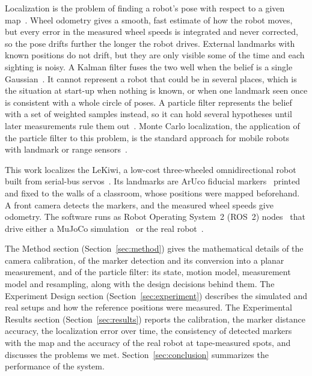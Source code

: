 \documentclass[conference]{IEEEtran}
\begin{document}
Localization is the problem of finding a robot's pose with respect to a given map~\cite{clark6b}. Wheel odometry gives a smooth, fast estimate of how the robot moves, but every error in the measured wheel speeds is integrated and never corrected, so the pose drifts further the longer the robot drives. External landmarks with known positions do not drift, but they are only visible some of the time and each sighting is noisy. A Kalman filter fuses the two well when the belief is a single Gaussian~\cite{clark6b}. It cannot represent a robot that could be in several places, which is the situation at start-up when nothing is known, or when one landmark seen once is consistent with a whole circle of poses. A particle filter represents the belief with a set of weighted samples instead, so it can hold several hypotheses until later measurements rule them out~\cite{gordon1993,dellaert1999,thrun2005,clark7b}. Monte Carlo localization, the application of the particle filter to this problem, is the standard approach for mobile robots with landmark or range sensors~\cite{dellaert1999,thrun2005}.

This work localizes the LeKiwi, a low-cost three-wheeled omnidirectional robot built from serial-bus servos~\cite{lerobot}. Its landmarks are ArUco fiducial markers~\cite{garrido2014} printed and fixed to the walls of a classroom, whose positions were mapped beforehand. A front camera detects the markers, and the measured wheel speeds give odometry. The software runs as Robot Operating System~2 (ROS~2) nodes~\cite{macenski2022} that drive either a MuJoCo simulation~\cite{todorov2012} or the real robot~\cite{for26}.

The Method section (Section~\ref{sec:method}) gives the mathematical details of the camera calibration, of the marker detection and its conversion into a planar measurement, and of the particle filter: its state, motion model, measurement model and resampling, along with the design decisions behind them. The Experiment Design section (Section~\ref{sec:experiment}) describes the simulated and real setups and how the reference positions were measured. The Experimental Results section (Section~\ref{sec:results}) reports the calibration, the marker distance accuracy, the localization error over time, the consistency of detected markers with the map and the accuracy of the real robot at tape-measured spots, and discusses the problems we met. Section~\ref{sec:conclusion} summarizes the performance of the system.

\end{document}
